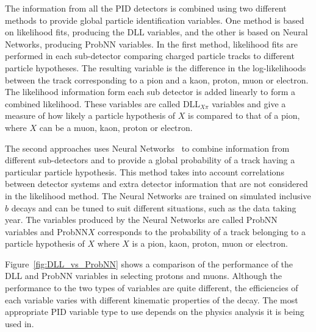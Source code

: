 The information from all the PID detectors is combined using two different methods to provide global particle identification variables. One method is based on likelihood fits, producing the DLL variables, and the other is based on Neural Networks, producing ProbNN variables. In the first method, likelihood fits are performed in each sub-detector comparing charged particle tracks to different particle hypotheses. The resulting variable is the difference in the log-likelihoods between the track corresponding to a pion and a kaon, proton, muon or electron. The likelihood information form each sub detector is added linearly to form a combined likelihood. 
These variables are called DLL$_{X\pi}$ variables and give a measure of how likely a particle hypothesis of $X$ is compared to that of a pion, where $X$ can be a muon, kaon, proton or electron.

The second approaches uses Neural Networks~\cite{Feindt:2006pm} to combine information from different sub-detectors and to provide a global probability of a track having a particular particle hypothesis. This method takes into account correlations between detector systems and extra detector information that are not considered in the likelihood method. The Neural Networks are trained on simulated inclusive $b$ decays and can be tuned to suit different situations, such as the data taking year. The variables produced by the Neural Networks are called ProbNN variables and ProbNN$X$ corresponds to the probability of a track belonging to a particle hypothesis of $X$ where $X$ is a pion, kaon, proton, muon or electron. 

Figure~\ref{fig:DLL_vs_ProbNN} shows a comparison of the performance of the DLL and ProbNN variables in selecting protons and muons. Although the performance to the two types of variables are quite different, the efficiencies of each variable varies with different kinematic properties of the decay. The most appropriate PID variable type to use depends on the physics analysis it is being used in. 

